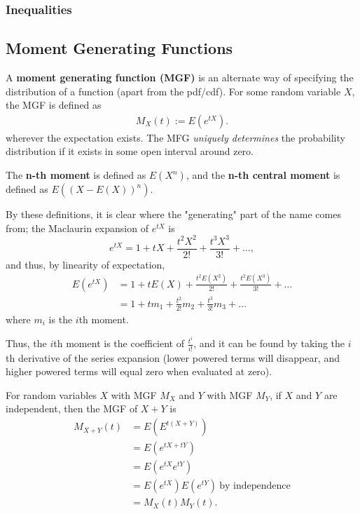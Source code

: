 \documentclass[a4paper,10pt]{article}
\begin{document}
\subsubsection{Inequalities}

\subsection{Moment Generating Functions}

A \textbf{moment generating function (MGF)} is an alternate way of specifying the distribution of a function (apart from the pdf/cdf). For some random variable $X$, the MGF is defined as 
\begin{align*}
    M_X(t) := E(e^{tX}).
\end{align*}
wherever the expectation exists. The MFG \textit{uniquely determines} the probability distribution if it exists in some open interval around zero. 

The \textbf{n-th moment} is defined as $E(X^n)$, and the \textbf{n-th central moment} is defined as $E\left(\left(X-E(X)\right)^n\right)$.

By these definitions, it is clear where the "generating" part of the name comes from; the Maclaurin expansion of $e^{tX}$ is 
\begin{equation*}
    e^{tX} = 1 + tX + \frac{t^2X^2}{2!} + \frac{t^3X^3}{3!} + \ldots,
\end{equation*}
and thus, by linearity of expectation, 
\begin{align*}
    E(e^{tX}) &= 1 + tE(X) + \frac{t^2E(X^2)}{2!} + \frac{t^2E(X^3)}{3!} + \ldots \\
              &= 1 + tm_1 + \frac{t^2}{2!}m_2 + \frac{t^3}{3!}m_3 + \ldots 
\end{align*}
where $m_i$ is the $i$th moment. 

Thus, the $i$th moment is the coefficient of $\frac{t^i}{i!}$, and it can be found by taking the $i$th derivative of the series expansion (lower powered terms will disappear, and higher powered terms will equal zero when evaluated at zero).  

For random variables $X$ with MGF $M_X$ and $Y$ with MGF $M_Y$, if $X$ and $Y$ are independent, then the MGF of $X+Y$ is 
\begin{align*}
    M_{X+Y}(t) &= E(E^{t(X+Y)}) \\
               &= E(e^{tX+tY}) \\
               &= E(e^{tX}e^{tY}) \\
               &= E(e^{tX})E(e^{tY})~\text{by independence} \\
               &= M_X(t)M_Y(t).
\end{align*}
\end{document}
